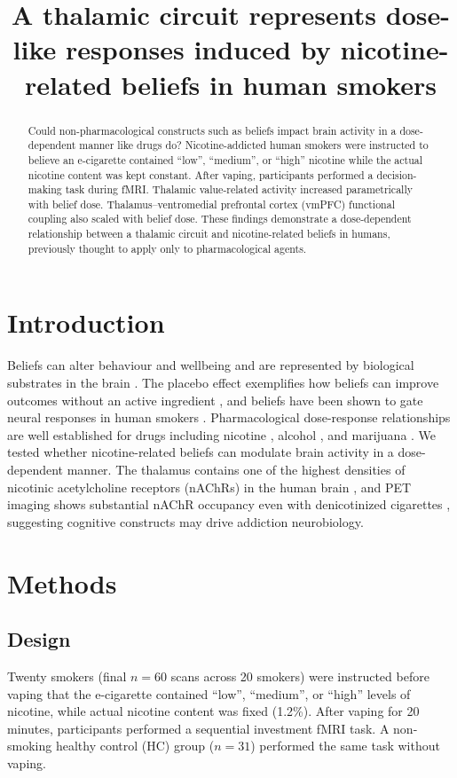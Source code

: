 \documentclass[11pt]{article}
\title{A thalamic circuit represents dose-like responses induced by nicotine-related beliefs in human smokers}
\author{}
\date{}
\begin{document}
\maketitle

\begin{abstract}
Could non-pharmacological constructs such as beliefs impact brain activity in a dose-dependent manner like drugs do? Nicotine-addicted human smokers were instructed to believe an e-cigarette contained ``low'', ``medium'', or ``high'' nicotine while the actual nicotine content was kept constant. After vaping, participants performed a decision-making task during fMRI. Thalamic value-related activity increased parametrically with belief dose. Thalamus--ventromedial prefrontal cortex (vmPFC) functional coupling also scaled with belief dose. These findings demonstrate a dose-dependent relationship between a thalamic circuit and nicotine-related beliefs in humans, previously thought to apply only to pharmacological agents.
\end{abstract}

\section{Introduction}
Beliefs can alter behaviour and wellbeing and are represented by biological substrates in the brain \citep{r1,r2}. The placebo effect exemplifies how beliefs can improve outcomes without an active ingredient \citep{r5,r6,r7,r8,r9}, and beliefs have been shown to gate neural responses in human smokers \citep{r10,r11}. Pharmacological dose-response relationships are well established for drugs including nicotine \citep{r12}, alcohol \citep{r13}, and marijuana \citep{r14}. We tested whether nicotine-related beliefs can modulate brain activity in a dose-dependent manner. The thalamus contains one of the highest densities of nicotinic acetylcholine receptors (nAChRs) in the human brain \citep{r19,r20}, and PET imaging shows substantial nAChR occupancy even with denicotinized cigarettes \citep{r22,r23,r24}, suggesting cognitive constructs may drive addiction neurobiology.

\section{Methods}
\subsection{Design}
Twenty smokers (final $n=60$ scans across 20 smokers) were instructed before vaping that the e-cigarette contained ``low'', ``medium'', or ``high'' levels of nicotine, while actual nicotine content was fixed (1.2\%). After vaping for 20 minutes, participants performed a sequential investment fMRI task. A non-smoking healthy control (HC) group ($n=31$) performed the same task without vaping.
\end{document}
